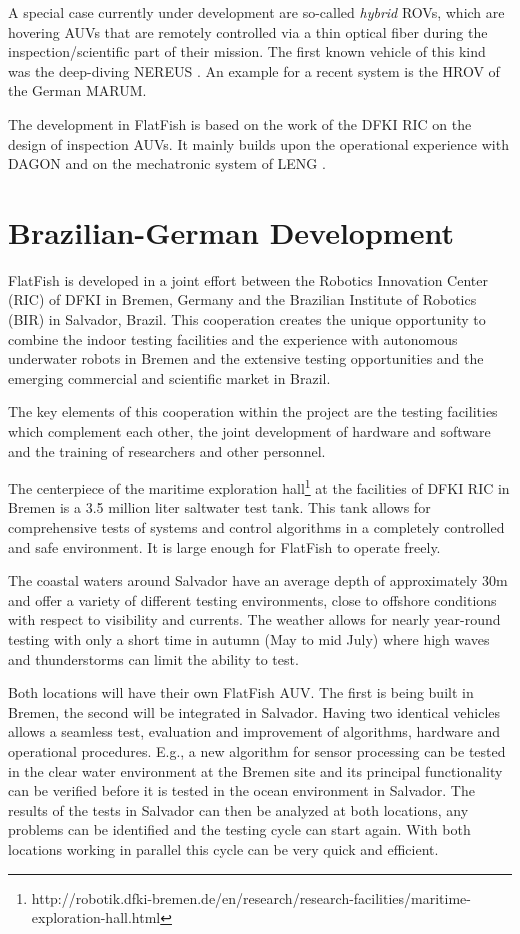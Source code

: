 \documentclass[conference]{IEEEtran}
\begin{document}
A special case currently under development are so-called \textit{hybrid} ROVs, which
are hovering AUVs that are remotely controlled via a thin optical fiber during
the inspection/scientific part of their mission. The first known vehicle of this kind was
the deep-diving NEREUS \cite{bowen2009}. An example for a recent system is the HROV
\cite{meinecke2011} of the German MARUM.

The development in FlatFish is based on the work of the DFKI RIC on the design of
inspection AUVs. It mainly builds upon the operational experience with DAGON
\cite{hildebrandt2012} and on the mechatronic system of LENG \cite{hildebrandt2013}.

\section{Brazilian-German Development}

FlatFish is developed in a joint effort between the Robotics Innovation Center (RIC) of
DFKI in Bremen, Germany and the Brazilian Institute of Robotics (BIR) in Salvador,
Brazil. This cooperation creates the unique opportunity to combine the indoor testing
facilities and the experience with autonomous underwater robots in Bremen and the 
extensive testing opportunities and the emerging commercial and scientific market in Brazil.

The key elements of this cooperation within the project are the testing facilities which
complement each other, the joint development of hardware and software and the training of
researchers and other personnel.

The centerpiece of the maritime exploration
hall\footnote{http://robotik.dfki-bremen.de/en/research/research-facilities/maritime-exploration-hall.html}
at the facilities of DFKI RIC in Bremen is a 3.5 million liter saltwater test tank. This
tank allows for comprehensive tests of systems and control algorithms in a completely
controlled and safe environment. It is large enough for FlatFish to operate freely.

The coastal waters around Salvador have an average depth of approximately 30m and offer a
variety of different testing environments, close to offshore conditions with respect to
visibility and currents. The weather allows for nearly year-round testing with only a
short time in autumn (May to mid July) where high waves and thunderstorms can limit the
ability to test. 

Both locations will have their own FlatFish AUV. The first is being built in Bremen, the
second will be integrated in Salvador. Having two identical vehicles allows a seamless test,
evaluation and improvement of algorithms, hardware and operational procedures. E.g., a new algorithm for sensor processing can be tested in the clear water environment at the Bremen site and its principal functionality can be verified before it is tested in the ocean
environment in Salvador. The results of the tests in Salvador can then be analyzed at both
locations, any problems can be identified and the testing cycle can start again. With both
locations working in parallel this cycle can be very quick and efficient.
\end{document}
